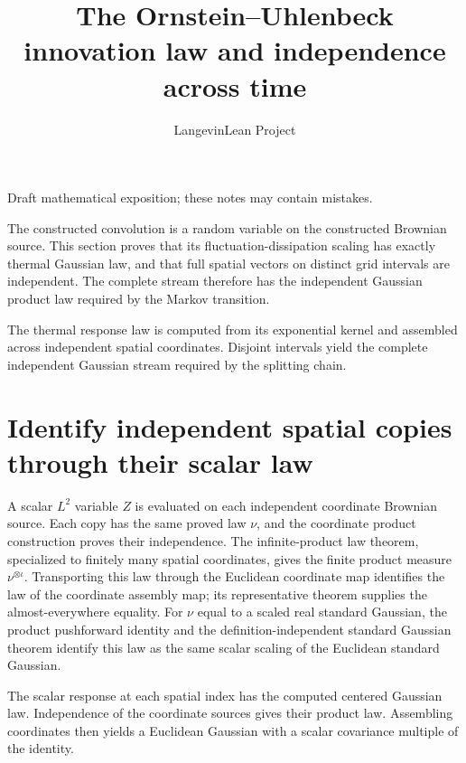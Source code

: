 \documentclass[11pt,a4paper]{article}
\title{\texorpdfstring{The Ornstein–Uhlenbeck innovation law and independence across time}{The Ornstein–Uhlenbeck innovation law and independence across time}}
\author{LangevinLean Project}
\date{}
\begin{document}
\maketitle
Draft mathematical exposition; these notes may contain mistakes.


The constructed convolution is a random variable on the constructed Brownian source. This section proves that its fluctuation-dissipation scaling has exactly thermal Gaussian law, and that full spatial vectors on distinct grid intervals are independent. The complete stream therefore has the independent Gaussian product law required by the Markov transition.



The thermal response law is computed from its exponential kernel and assembled across independent spatial coordinates. Disjoint intervals yield the complete independent Gaussian stream required by the splitting chain.


\section{\texorpdfstring{Identify independent spatial copies through their scalar law}{Identify independent spatial copies through their scalar law}}


A scalar \(L^{2}\) variable \(Z\) is evaluated on each independent coordinate Brownian source. Each copy has the same proved law \(\nu\), and the coordinate product construction proves their independence. The infinite-product law theorem, specialized to finitely many spatial coordinates, gives the finite product measure \(\nu^{\otimes\iota}\). Transporting this law through the Euclidean coordinate map identifies the law of the coordinate assembly map; its representative theorem supplies the almost-everywhere equality. For \(\nu\) equal to a scaled real standard Gaussian, the product pushforward identity and the definition-independent standard Gaussian theorem identify this law as the same scalar scaling of the Euclidean standard Gaussian.



The scalar response at each spatial index has the computed centered Gaussian law. Independence of the coordinate sources gives their product law. Assembling coordinates then yields a Euclidean Gaussian with a scalar covariance multiple of the identity.
\end{document}
